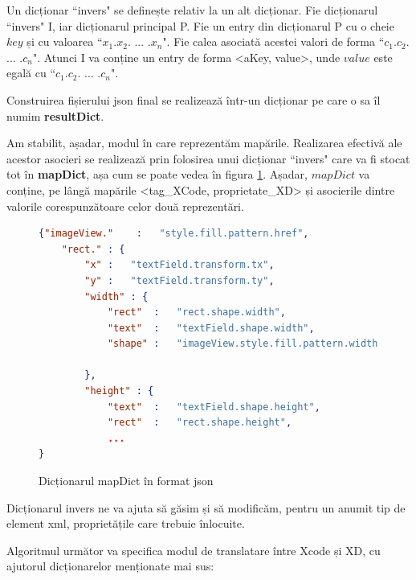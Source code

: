 \begin{mydef}
Un dicționar ``invers" se definește relativ la un alt dicționar. 
Fie dicționarul ``invers" I, iar dicționarul principal P. 
Fie un entry din dicționarul P cu o cheie $key$ și cu valoarea ``$x_1$.$x_2$. ... .$x_n$".
Fie calea asociată acestei valori de forma ``$c_1$.$c_2$. ... .$c_n$".
Atunci I va conține un entry de forma <aKey, value>, unde $value$ este egală cu ``$c_1$.$c_2$. ... .$c_n$".
\\
\end{mydef}

\begin{myNote}
Construirea fișierului json final se realizează într-un dicționar pe care o sa îl numim \textbf{resultDict}.
\end{myNote}

Am stabilit, așadar, modul în care reprezentăm mapările. Realizarea efectivă ale acestor asocieri se realizează prin folosirea unui dicționar ``invers" care va fi stocat tot în \textbf{mapDict}, așa cum se poate vedea în figura \ref{fig:MapDict Schema}. Așadar, $mapDict$ va conține, pe lângă mapările <tag_XCode, proprietate_XD> și asocierile dintre valorile corespunzătoare celor două reprezentări.

\begin{figure}[!htbp]
\begin{lstlisting}[language=json,firstnumber=1]
{"imageView."    :   "style.fill.pattern.href",
    "rect." : {
        "x" :   "textField.transform.tx",
        "y" :   "textField.transform.ty",
        "width" : {
            "rect"  :   "rect.shape.width",
            "text"  :   "textField.shape.width",
            "shape" :   "imageView.style.fill.pattern.width"
        
        },
        "height" : {
            "text"  :   "textField.shape.height",
            "rect"  :   "rect.shape.height",
            ...
}
\end{lstlisting}
\caption{Dicționarul mapDict în format json} \label{fig:MapDict Schema}
\end{figure}


Dicționarul invers ne va ajuta să găsim și să modificăm, pentru un anumit tip de element xml, proprietățile care trebuie înlocuite. 

Algoritmul următor va specifica modul de translatare între Xcode și XD, cu ajutorul dicționarelor menționate mai sus:

